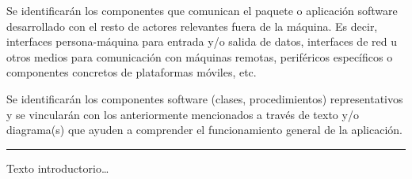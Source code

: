 \documentclass[12pt,a4paper,titlepage]{article}
\begin{document}
    Se identificarán los componentes que comunican el paquete o aplicación software desarrollado con el resto de actores relevantes fuera de la máquina. Es decir, interfaces persona-máquina para entrada y/o salida de datos, interfaces de red u otros medios para comunicación con máquinas remotas, periféricos específicos o componentes concretos de plataformas móviles, etc.

    Se identificarán los componentes software (clases, procedimientos) representativos y se vincularán con los anteriormente mencionados a través de texto y/o diagrama(s) que ayuden a comprender el funcionamiento general de la aplicación.

    \bigskip\hrule\bigskip

    Texto introductorio\dots

    

    \newpage

    \printbibliography
    \newpage

    \lstlistoflistings
\end{document}

